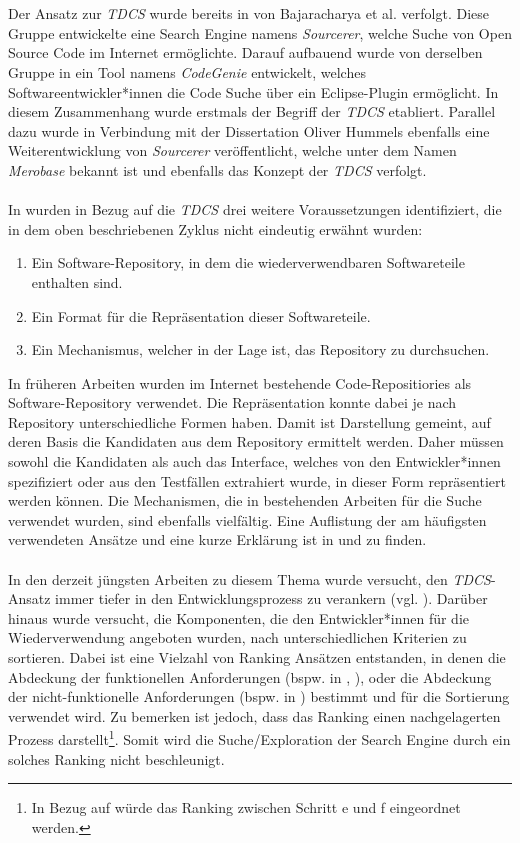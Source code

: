 \\\\
Der Ansatz zur \emph{TDCS} wurde bereits in \cite{sourcerer} von Bajaracharya et al.  verfolgt. Diese Gruppe entwickelte eine Search Engine namens \emph{Sourcerer}, welche Suche von Open Source Code im Internet ermöglichte. Darauf aufbauend wurde von derselben Gruppe in \cite{Lemos} ein Tool namens \emph{CodeGenie} entwickelt, welches Softwareentwickler*innen die Code Suche über ein Eclipse-Plugin ermöglicht. In diesem Zusammenhang wurde erstmals der Begriff der \emph{TDCS} etabliert. Parallel dazu wurde in Verbindung mit der Dissertation Oliver Hummels \cite{hummel08} ebenfalls eine Weiterentwicklung von \emph{Sourcerer} veröffentlicht, welche unter dem Namen \emph{Merobase} bekannt ist und ebenfalls das Konzept der \emph{TDCS} verfolgt.
\\\\
In \cite{hummel08} wurden in Bezug auf die \emph{TDCS} drei weitere Voraussetzungen identifiziert, die in dem oben beschriebenen Zyklus nicht eindeutig erwähnt wurden:
\begin{enumerate}
\item Ein Software-Repository, in dem die wiederverwendbaren Softwareteile enthalten sind.
\item Ein Format für die Repräsentation dieser Softwareteile.
\item Ein Mechanismus, welcher in der Lage ist, das Repository zu durchsuchen.
\end{enumerate}
\noindent
In früheren Arbeiten wurden im Internet bestehende Code-Repositiories als Software-Repository verwendet. Die Repräsentation konnte dabei je nach Repository unterschiedliche Formen haben. Damit ist Darstellung gemeint, auf deren Basis die Kandidaten aus dem Repository ermittelt werden. Daher müssen sowohl die Kandidaten als auch das Interface, welches von den Entwickler*innen spezifiziert oder aus den Testfällen extrahiert wurde, in dieser Form repräsentiert werden können. Die Mechanismen, die in bestehenden Arbeiten für die Suche verwendet wurden, sind ebenfalls vielfältig. Eine Auflistung der am häufigsten verwendeten Ansätze und eine kurze Erklärung ist in \cite{Hummel2013} und \cite{hummel08} zu finden.
\\\\
In den derzeit jüngsten Arbeiten zu diesem Thema wurde versucht, den \emph{TDCS}-Ansatz immer tiefer in den Entwicklungsprozess zu verankern (vgl. \cite{kessel2018}). Darüber hinaus wurde versucht, die Komponenten, die den Entwickler*innen für die Wiederverwendung angeboten wurden, nach unterschiedlichen Kriterien zu sortieren. Dabei ist eine Vielzahl von Ranking Ansätzen entstanden, in denen die Abdeckung der funktionellen Anforderungen (bspw. in \cite{STOLEE201635}, \cite{kessel2015}), oder die Abdeckung der nicht-funktionelle Anforderungen (bspw. in \cite{kessel2016}) bestimmt und für die Sortierung verwendet wird. Zu bemerken ist jedoch, dass das Ranking  einen nachgelagerten Prozess darstellt\footnote{In Bezug auf  würde das Ranking zwischen Schritt e und f eingeordnet werden.}. Somit wird die Suche/Exploration der Search Engine durch ein solches Ranking nicht beschleunigt.

